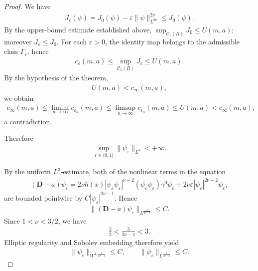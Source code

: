 \documentclass[11pt,final]{amsart}
\newcommand{\eps}{\varepsilon}
\newcommand{\pD}{\mathbf{D}}
\begin{document}
\begin{proof}
We have
\begin{align}
J_\eps(\psi)=J_0(\psi)-\eps\|\psi\|_{L^{2\nu}}^{2\nu}
\le J_0(\psi).
\end{align}
By the upper-bound estimate established above,
$\sup_{\mathscr C_1(R)}J_0\le U(m,a)$; moreover $J_\eps\le J_0$. For each $\eps>0$, the identity map belongs to the admissible class $\Gamma_\eps$, hence
\begin{align}
c_\eps(m,a)
\le
\sup_{\mathscr C_1(R)}J_\eps
\le U(m,a).
\end{align}
By the hypothesis of the theorem,
\begin{align}
U(m,a)<c_\infty(m,a),
\end{align}
we obtain
\begin{align}
c_\infty(m,a)
\le
\liminf_{n\to\infty}c_{\eps_n}(m,a)
\le
\limsup_{n\to\infty}c_{\eps_n}(m,a)
\le U(m,a)
<c_\infty(m,a),
\end{align}
a contradiction.

Therefore
\begin{align}
\sup_{\eps\in(0,1]}
\|\psi_\eps\|_{L^3}<+\infty.
\end{align}

By the uniform $L^3$-estimate, both of the nonlinear terms in the equation
\begin{align}
(\pD-a)\psi_\eps
=
2\nu h(x)|\overline{\psi_\eps}\psi_\eps|^{\nu-2}
(\overline{\psi_\eps}\psi_\eps)\gamma^0\psi_\eps
+
2\nu\eps|\psi_\eps|^{2\nu-2}\psi_\eps,
\end{align}
are bounded pointwise by $C|\psi_\eps|^{2\nu-1}$. Hence
\begin{align}
\|(\pD-a)\psi_\eps\|_{L^{\frac{3}{2\nu-1}}}
\le C.
\end{align}
Since $1<\nu<3/2$, we have
\begin{align}
\frac32<\frac{3}{2\nu-1}<3.
\end{align}
Elliptic regularity and Sobolev embedding therefore yield
\begin{align}
\|\psi_\eps\|_{W^{1,\frac{3}{2\nu-1}}}\le C,
\qquad
\|\psi_\eps\|_{L^{\frac{3}{2\nu-2}}}\le C.
\end{align}


\end{proof}
\end{document}
